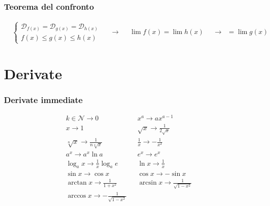 \documentclass[a4paper]{article}
\begin{document}
	\subsubsection{Teorema del confronto}
	\begin{align*}
	&\begin{cases}
			\mathcal{D}_{f(x)} = \mathcal{D}_{g(x)} = \mathcal{D}_{h(x)}\\
			f(x) \le g(x) \le h(x)
		\end{cases}	&	&\to	&	&\lim f(x) = \lim h(x)	&	&\to	&=\lim g(x)
	\end{align*}
	
	
	\newpage
	\section{Derivate}
	\subsubsection{Derivate immediate}
	\begin{align*}
		&k \in \mathcal{N}  \to 0                       & &x^a          \to	 ax^{a-1}              \\
		&x                  \to 1                       & &\sqrt{x}     \to 	\frac{1}{2\sqrt{x}}   \\
		&\sqrt[n]{x}        \to \frac{1}{n\sqrt[n]{x}}  & &\frac{1}{x}  \to -\frac{1}{x^2}         \\
		&a^x                \to a^x\ln a                & &e^x          \to e^x                    \\
		&\log_{a} x         \to \frac{1}{x} \log_{a} e  & &\ln x        \to \frac{1}{x}            \\
		&\sin x             \to \cos x                  & &\cos x       \to -\sin x                \\
		&\arctan x          \to \frac{1}{1+x^2}         & &\arcsin x    \to \frac{1}{\sqrt{1-x^2}} \\
		&\arccos x          \to -\frac{1}{\sqrt{1-x^2}} &\\
	\end{align*}
	
\end{document}
